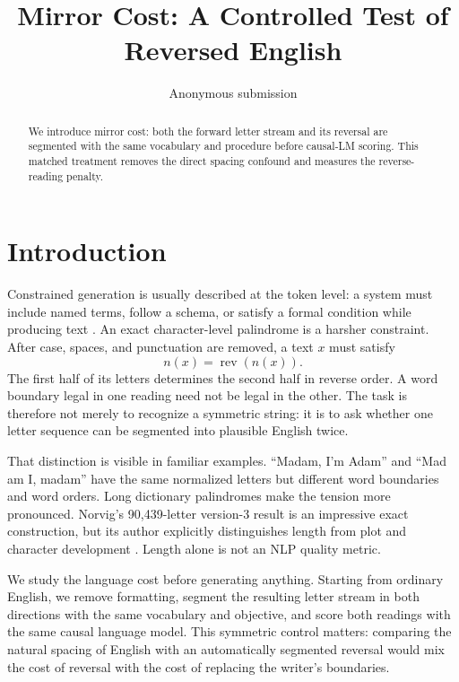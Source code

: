 \documentclass[11pt]{article}
\title{Mirror Cost: A Controlled Test of Reversed English}
\author{Anonymous submission}
\newcommand{\norm}[1]{n(#1)}
\newcommand{\rev}{\operatorname{rev}}
\begin{document}
\maketitle

\begin{abstract}
We introduce mirror cost: both the forward letter stream and its reversal are segmented with the same vocabulary and procedure before causal-LM scoring. This matched treatment removes the direct spacing confound and measures the reverse-reading penalty.
\end{abstract}

\section{Introduction}

Constrained generation is usually described at the token level: a system must
include named terms, follow a schema, or satisfy a formal condition while
producing text \citep{hokamp2017grid,post2018fast,lu2022astar}. An exact
character-level palindrome is a harsher constraint. After case, spaces, and
punctuation are removed, a text $x$ must satisfy
\begin{equation}
  \norm{x}=\rev(\norm{x}).
\end{equation}
The first half of its letters determines the second half in reverse order. A
word boundary legal in one reading need not be legal in the other. The task is
therefore not merely to recognize a symmetric string: it is to ask whether one
letter sequence can be segmented into plausible English twice.

That distinction is visible in familiar examples. ``Madam, I'm Adam'' and
``Mad am I, madam'' have the same normalized letters but different word
boundaries and word orders. Long dictionary palindromes make the tension more
pronounced. Norvig's 90,439-letter version-3 result is an impressive exact
construction, but its author explicitly distinguishes length from plot and
character development \citep{norvig2016palindrome}. Length alone is not an
NLP quality metric.

We study the language cost before generating anything. Starting from ordinary
English, we remove formatting, segment the resulting letter stream in both
directions with the same vocabulary and objective, and score both readings
with the same causal language model. This symmetric control matters: comparing
the natural spacing of English with an automatically segmented reversal would
mix the cost of reversal with the cost of replacing the writer's boundaries.
\end{document}
